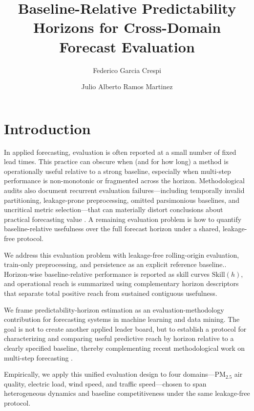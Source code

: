 \documentclass[pdflatex]{sn-jnl}
\title[Baseline-relative predictability horizons]{Baseline-Relative Predictability Horizons for Cross-Domain Forecast Evaluation}
\author*[1]{Federico Garcia Crespi}
\author[2]{Julio Alberto Ramos Martinez}
\affil[1]{Departamento de Ingenier\'ia de Computadores, Universidad Miguel Hern\'andez, Elche, Spain}
\affil[2]{Departamento de Estad\'istica, Matem\'aticas e Inform\'atica, Universidad Miguel Hern\'andez, Elche, Spain}
\begin{document}
\maketitle




\section{Introduction}

In applied forecasting, evaluation is often reported at a small number of fixed lead times. This practice can obscure when (and for how long) a method is operationally useful relative to a strong baseline, especially when multi-step performance is non-monotonic or fragmented across the horizon. Methodological audits also document recurrent evaluation failures—including temporally invalid partitioning, leakage-prone preprocessing, omitted parsimonious baselines, and uncritical metric selection—that can materially distort conclusions about practical forecasting value \citep{hewamalage2023dmkd}. A remaining evaluation problem is how to quantify baseline-relative usefulness over the full forecast horizon under a shared, leakage-free protocol.

We address this evaluation problem with leakage-free rolling-origin evaluation, train-only preprocessing, and persistence as an explicit reference baseline.. Horizon-wise baseline-relative performance is reported as skill curves $\mathrm{Skill}(h)$, and operational reach is summarized using complementary horizon descriptors that separate total positive reach from sustained contiguous usefulness.

We frame predictability-horizon estimation as an evaluation-methodology contribution for forecasting systems in machine learning and data mining. The goal is not to create another applied leader board, but to establish a protocol for characterizing and comparing useful predictive reach by horizon relative to a clearly specified baseline, thereby complementing recent methodological work on multi-step forecasting \citep{green2025stratify,kreuzer2025trend}.

Empirically, we apply this unified evaluation design to four domains—PM$_{2.5}$ air quality, electric load, wind speed, and traffic speed—chosen to span heterogeneous dynamics and baseline competitiveness under the same leakage-free protocol.
\end{document}
